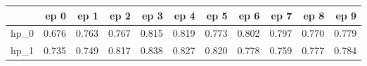 \begin{tabular}{lrrrrrrrrrr}
\toprule
{} &   ep 0 &   ep 1 &   ep 2 &   ep 3 &   ep 4 &   ep 5 &   ep 6 &   ep 7 &   ep 8 &   ep 9 \\
\midrule
hp\_0 &  0.676 &  0.763 &  0.767 &  0.815 &  0.819 &  0.773 &  0.802 &  0.797 &  0.770 &  0.779 \\
hp\_1 &  0.735 &  0.749 &  0.817 &  0.838 &  0.827 &  0.820 &  0.778 &  0.759 &  0.777 &  0.784 \\
\bottomrule
\end{tabular}
